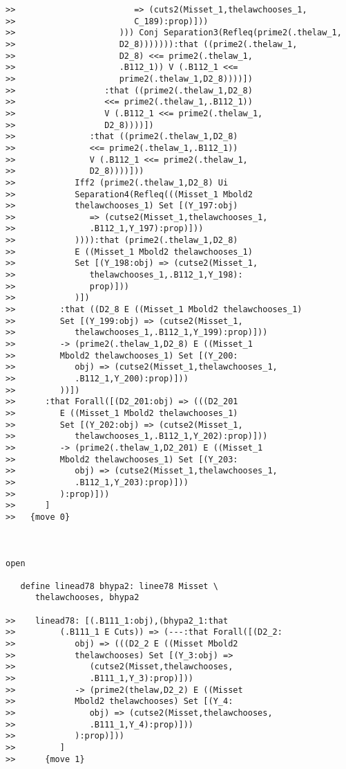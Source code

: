 \documentclass[12pt]{article}
\begin{document}
\begin{verbatim}
>>                        => (cuts2(Misset_1,thelawchooses_1,
>>                        C_189):prop)]))
>>                     ))) Conj Separation3(Refleq(prime2(.thelaw_1,
>>                     D2_8))))))):that ((prime2(.thelaw_1,
>>                     D2_8) <<= prime2(.thelaw_1,
>>                     .B112_1)) V (.B112_1 <<=
>>                     prime2(.thelaw_1,D2_8))))])
>>                  :that ((prime2(.thelaw_1,D2_8)
>>                  <<= prime2(.thelaw_1,.B112_1))
>>                  V (.B112_1 <<= prime2(.thelaw_1,
>>                  D2_8))))])
>>               :that ((prime2(.thelaw_1,D2_8)
>>               <<= prime2(.thelaw_1,.B112_1))
>>               V (.B112_1 <<= prime2(.thelaw_1,
>>               D2_8))))]))
>>            Iff2 (prime2(.thelaw_1,D2_8) Ui
>>            Separation4(Refleq(((Misset_1 Mbold2
>>            thelawchooses_1) Set [(Y_197:obj)
>>               => (cutse2(Misset_1,thelawchooses_1,
>>               .B112_1,Y_197):prop)]))
>>            )))):that (prime2(.thelaw_1,D2_8)
>>            E ((Misset_1 Mbold2 thelawchooses_1)
>>            Set [(Y_198:obj) => (cutse2(Misset_1,
>>               thelawchooses_1,.B112_1,Y_198):
>>               prop)]))
>>            )])
>>         :that ((D2_8 E ((Misset_1 Mbold2 thelawchooses_1)
>>         Set [(Y_199:obj) => (cutse2(Misset_1,
>>            thelawchooses_1,.B112_1,Y_199):prop)]))
>>         -> (prime2(.thelaw_1,D2_8) E ((Misset_1
>>         Mbold2 thelawchooses_1) Set [(Y_200:
>>            obj) => (cutse2(Misset_1,thelawchooses_1,
>>            .B112_1,Y_200):prop)]))
>>         ))])
>>      :that Forall([(D2_201:obj) => (((D2_201
>>         E ((Misset_1 Mbold2 thelawchooses_1)
>>         Set [(Y_202:obj) => (cutse2(Misset_1,
>>            thelawchooses_1,.B112_1,Y_202):prop)]))
>>         -> (prime2(.thelaw_1,D2_201) E ((Misset_1
>>         Mbold2 thelawchooses_1) Set [(Y_203:
>>            obj) => (cutse2(Misset_1,thelawchooses_1,
>>            .B112_1,Y_203):prop)]))
>>         ):prop)]))
>>      ]
>>   {move 0}



open

   define linead78 bhypa2: linee78 Misset \
      thelawchooses, bhypa2

>>    linead78: [(.B111_1:obj),(bhypa2_1:that
>>         (.B111_1 E Cuts)) => (---:that Forall([(D2_2:
>>            obj) => (((D2_2 E ((Misset Mbold2
>>            thelawchooses) Set [(Y_3:obj) =>
>>               (cutse2(Misset,thelawchooses,
>>               .B111_1,Y_3):prop)]))
>>            -> (prime2(thelaw,D2_2) E ((Misset
>>            Mbold2 thelawchooses) Set [(Y_4:
>>               obj) => (cutse2(Misset,thelawchooses,
>>               .B111_1,Y_4):prop)]))
>>            ):prop)]))
>>         ]
>>      {move 1}




\end{verbatim}
\end{document}
